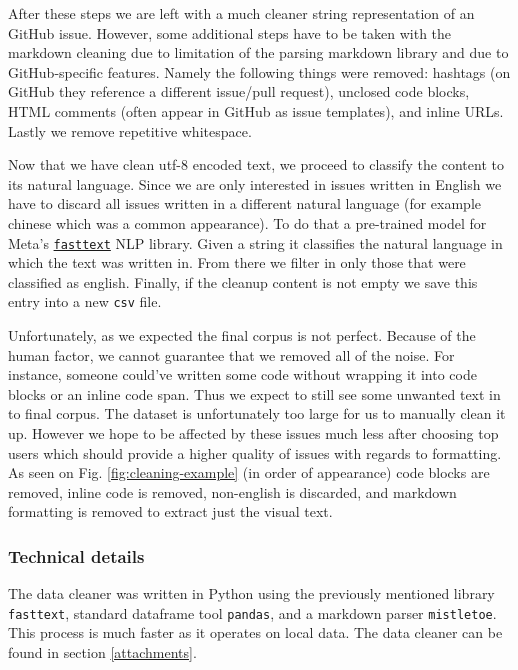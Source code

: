 \documentclass[]{article}
\newcommand{\code}[1]{\texttt{#1}}
\begin{document}
After these steps we are left with a much cleaner string representation of an GitHub issue. However, some additional steps have to be taken with the markdown cleaning due to limitation of the parsing markdown library and due to GitHub-specific features. Namely the following things were removed: hashtags (on GitHub they reference a different issue/pull request), unclosed code blocks, HTML comments (often appear in GitHub as issue templates), and inline URLs. Lastly we remove repetitive whitespace.

Now that we have clean utf-8 encoded text, we proceed to classify the content to its natural language. Since we are only interested in issues written in English we have to discard all issues written in a different natural language (for example chinese which was a common appearance). To do that a pre-trained model for Meta's \href{https://fasttext.cc/}{\code{fasttext}} NLP library. Given a string it classifies the natural language in which the text was written in. From there we filter in only those that were classified as english. Finally, if the cleanup content is not empty we save this entry into a new \code{csv} file.

Unfortunately, as we expected the final corpus is not perfect. Because of the human factor, we cannot guarantee that we removed all of the noise. For instance, someone could've written some code without wrapping it into code blocks or an inline code span. Thus we expect to still see some unwanted text in to final corpus. The dataset is unfortunately too large for us to manually clean it up. However we hope to be affected by these issues much less after choosing top users which should provide a higher quality of issues with regards to formatting. As seen on Fig. \ref{fig:cleaning-example} (in order of appearance) code blocks are removed, inline code is removed, non-english is discarded, and markdown formatting is removed to extract just the visual text.

\subsubsection{Technical details}

The data cleaner was written in Python using the previously mentioned library \code{fasttext}, standard dataframe tool \code{pandas}, and a markdown parser \code{mistletoe}. This process is much faster as it operates on local data. The data cleaner can be found in section \ref{attachments}.
\end{document}
